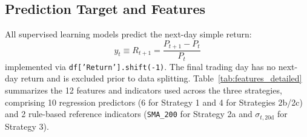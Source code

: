 \documentclass[11pt, a4paper]{article}
\begin{document}
\subsection{Prediction Target and Features}
\label{sec:features}

All supervised learning models predict the next-day simple return:
\begin{equation}
y_t \equiv R_{t+1} = \frac{P_{t+1} - P_t}{P_t}
\end{equation}
implemented via \texttt{df['Return'].shift(-1)}. The final trading day has no next-day return and is excluded prior to data splitting. Table~\ref{tab:features_detailed} summarizes the 12 features and indicators used across the three strategies, comprising 10 regression predictors (6 for Strategy 1 and 4 for Strategies 2b/2c) and 2 rule-based reference indicators (\texttt{SMA\_200} for Strategy 2a and $\sigma_{t, 20\text{d}}$ for Strategy 3).
\end{document}
